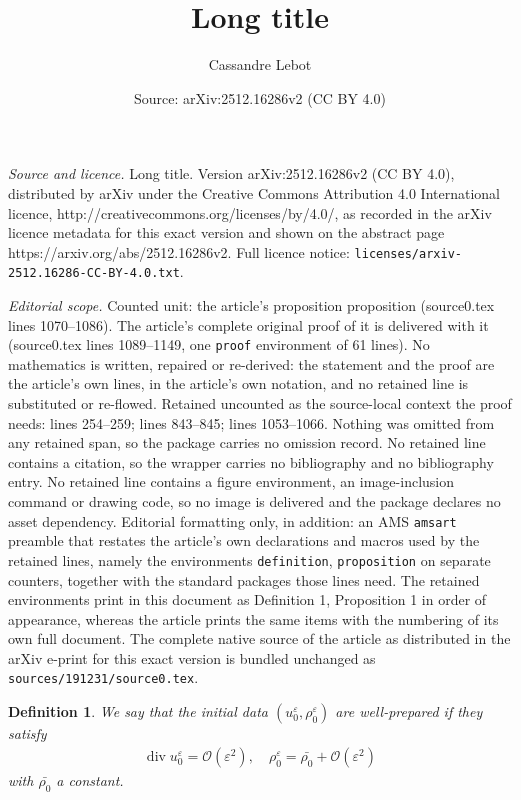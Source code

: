\documentclass[10pt,a4paper]{amsart}
\title{Long title}
\author{Cassandre Lebot}
\date{Source: arXiv:2512.16286v2 (CC BY 4.0)}
\newtheorem{definition}{Definition}
\newcommand{\bigO}{\mathcal{O}}
\renewcommand{\div}{\operatorname{div}}
\newcommand{\eps}{\varepsilon}
\begin{document}
\maketitle

\noindent\emph{Source and licence.} Long title. Version arXiv:2512.16286v2 (CC BY 4.0), distributed by arXiv under the Creative Commons Attribution 4.0 International licence, http://creativecommons.org/licenses/by/4.0/, as recorded in the arXiv licence metadata for this exact version and shown on the abstract page https://arxiv.org/abs/2512.16286v2. Full licence notice: \texttt{licenses/arxiv-2512.16286-CC-BY-4.0.txt}.\par\smallskip

\noindent\textit{Editorial scope.} Counted unit: the article's proposition proposition (source0.tex lines 1070--1086). The article's complete original proof of it is delivered with it (source0.tex lines 1089--1149, one \texttt{proof} environment of 61 lines). No mathematics is written, repaired or re-derived: the statement and the proof are the article's own lines, in the article's own notation, and no retained line is substituted or re-flowed.  Retained uncounted as the source-local context the proof needs: lines 254--259; lines 843--845; lines 1053--1066.  Nothing was omitted from any retained span, so the package carries no omission record.  No retained line contains a citation, so the wrapper carries no bibliography and no bibliography entry.  No retained line contains a figure environment, an image-inclusion command or drawing code, so no image is delivered and the package declares no asset dependency.  Editorial formatting only, in addition: an AMS \texttt{amsart} preamble that restates the article's own declarations and macros used by the retained lines, namely the environments \texttt{definition}, \texttt{proposition} on separate counters, together with the standard packages those lines need.  The retained environments print in this document as Definition 1, Proposition 1 in order of appearance, whereas the article prints the same items with the numbering of its own full document.  The complete native source of the article as distributed in the arXiv e-print for this exact version is bundled unchanged as \texttt{sources/191231/source0.tex}.
\begin{definition}\label{defwpd} We say that the initial data $(u_0^\eps, \rho_0^\eps)$ are well-prepared if they satisfy
\begin{align*}
    \div u_0^\eps = \bigO(\eps^2), \quad  \rho_0^\eps = \bar{\rho_0} + \bigO(\eps^2)
\end{align*}
with $\bar{\rho_0}$ a constant.
\end{definition}
\end{document}
